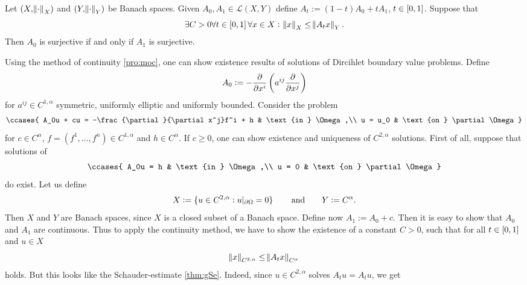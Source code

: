 \begin{proposition}
	\label{pro:moc}
	Let $(X,\norm{\cdot}_X)$ and $(Y,\norm{\cdot}_Y)$ be Banach spaces. Given $A_0,A_1 \in \mathcal{L}(X,Y)$ define $A_t := (1 - t)A_0 + tA_1$, $t \in \intcc{0,1}$. Suppose that
	\begin{equation*}
		\exists C > 0\forall t \in \intcc{0,1}\forall x \in X:\> \norm{x}_X \leq \norm{A_t x}_Y.
	\end{equation*}
	\noindent Then $A_0$ is surjective if and only if $A_1$ is surjective.
\end{proposition}

Using the method of continuity \ref{pro:moc}, one can show existence results of solutions of Dircihlet boundary value problems. Define
\begin{equation*}
	A_0 := - \frac{\partial}{\partial x^i}\del[3]{a^{ij}\frac{\partial}{\partial x^j}}
\end{equation*}
\noindent for $a^{ij} \in C^{1,\alpha}$ symmetric, uniformly elliptic and uniformly bounded. Consider the problem
\begin{align*}
	\ccases{
		A_0u + cu = -\frac{\partial}{\partial x^j}f^i + h & \text{in } \Omega,\\
		u = u_0 & \text{on } \partial \Omega
	}
\end{align*}
\noindent for $c \in C^\alpha$, $f = (f^1,\dots,f^n) \in C^{1,\alpha}$ and $h \in C^\alpha$. If $c \geq 0$, one can show existence and uniqueness of $C^{2,\alpha}$ solutions. First of all, suppose that solutions of 
\begin{align*}
	\ccases{
		A_0u = h & \text{in } \Omega,\\
		u = 0 & \text{on } \partial \Omega
	}
\end{align*}
\noindent do exist. Let us define
\begin{equation*}
	X := \cbr[0]{u \in C^{2,\alpha} : u\vert_{\partial \Omega} = 0} \qquad \text{and} \qquad Y := C^\alpha.
\end{equation*}
Then $X$ and $Y$ are Banach spaces, since $X$ is a closed subset of a Banach space. Define now $A_1 := A_0 + c$. Then it is easy to show that $A_0$ and $A_1$ are continuous. Thus to apply the continuity method, we have to show the existence of a constant $C > 0$, such that for all $t \in \intcc{0,1}$ and $u \in X$
\begin{equation*}
	\norm{x}_{C^{2,\alpha}} \leq \norm{A_t x}_{C^\alpha}
\end{equation*}
\noindent holds. But this looks like the Schauder-estimate \ref{thm:gSe}. Indeed, since $u \in C^{2,\alpha}$ solves $A_t u = A_tu$, we get
